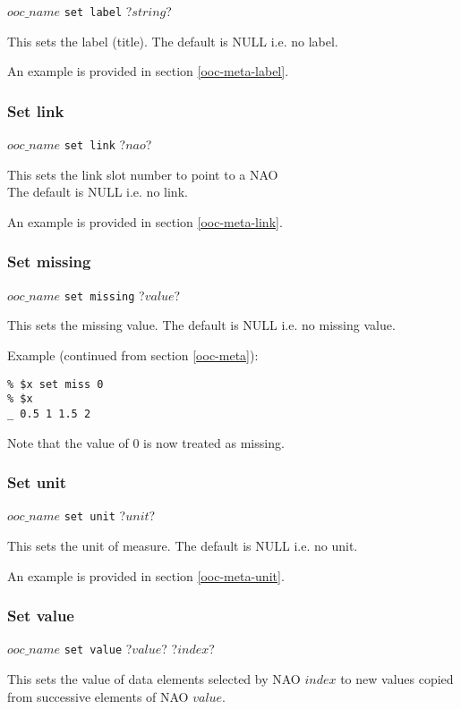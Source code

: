 $ooc\_name$ \texttt{set label} ?$string$?

This sets the label (title). The default is NULL i.e. no
  label.
  

An example is provided in section \ref{ooc-meta-label}.

\subsubsection{Set link}
    \label{ooc-modify-set-link}

$ooc\_name$ \texttt{set link} ?$nao$?

This sets the link slot number to point to a NAO
  \\The default is NULL i.e. no link.
  

An example is provided in section \ref{ooc-meta-link}.

\subsubsection{Set missing}
    \label{ooc-modify-set-missing}

$ooc\_name$ \texttt{set missing} ?$value$?

This sets the missing value. The default is NULL i.e. no missing
  value.
  
Example (continued from section \ref{ooc-meta}):
  \begin{verbatim}
% $x set miss 0
% $x
_ 0.5 1 1.5 2
\end{verbatim}

Note that the value of 0 is now treated as missing.

\subsubsection{Set unit}
    \label{ooc-modify-set-unit}

$ooc\_name$ \texttt{set unit} ?$unit$?

This sets the unit of measure. The default is NULL i.e. no
  unit.
  

An example is provided in section \ref{ooc-meta-unit}.

\subsubsection{Set value}
    \label{ooc-modify-set-value}

$ooc\_name$ \texttt{set value} ?$value$? ?$index$?

This sets the value of data elements selected by NAO 
  $index$ to new values copied from successive elements of NAO
  $value$.
  


